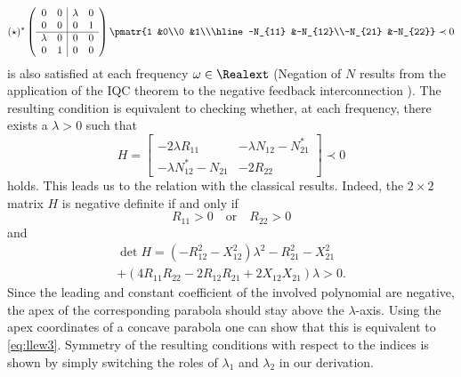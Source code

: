 \begin{equation}
({\star})^*\left(\begin{array}{cc|cc}
      0&0  &\lambda &0 \\
      0&0  &0         &1\\ \hline
      \lambda &0 &0 &0\\
      0 &1 &0 &0
\end{array}\right)
\pmatr{1 &0\\0 &1\\\hline-N_{11} &-N_{12}\\-N_{21} &-N_{22}} \prec 0
\label{eq:LlewellynFDI}
\end{equation}
is also satisfied at each frequency $\omega\in\Realext$ (Negation of $N$ results from the application of the IQC theorem to the negative feedback interconnection ). The resulting condition is equivalent to checking whether, at each frequency, there exists a $\lambda > 0$ such that
\[
H = \left[\begin{array}{cc} - 2\lambda R_{11} &  -\lambda N_{12} - N^*_{21}\\ -\lambda N_{12}^* - N_{21} &-2R_{22} \end{array}\right]\prec 0
\]
holds. This leads us to the relation with the classical results. Indeed, the $2\times 2$ matrix $H$ is negative definite if and only if
\[
R_{11} > 0 \quad \text{or} \quad R_{22} > 0
\]
and
\begin{multline*}
\det H =  \left(-R_{12}^2 - X_{12}^2\right)\lambda^2 - R_{21}^2 - X_{21}^2 \\ + \left(4R_{11}R_{22} - 2R_{12}R_{21} + 2X_{12}X_{21}\right)\lambda  > 0.
\end{multline*}
Since the leading and constant coefficient of the involved polynomial are negative, the apex of the corresponding parabola should stay above the $\lambda$-axis. Using the apex coordinates of a concave parabola one can show that this is equivalent to \eqref{eq:llew3}. Symmetry of the resulting conditions with respect to the indices is shown by simply switching the roles of $\lambda_1$ and $\lambda_2$ in our derivation.


